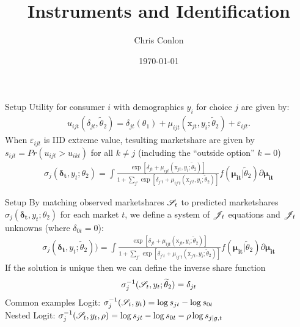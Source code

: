 \documentclass[aspectratio=169,11pt]{beamer}
\begin{document}
\title{Instruments and Identification }
\author{Chris Conlon}
\date{\today}

\frame{\titlepage}


\begin{frame}{Setup}
Utility for consumer $i$ with demographics $y_i$ for choice $j$ are given by:
\begin{align*}
\label{eq:utility}
u_{ijt}(\delta_{jt},\widetilde{\theta}_2) =  \delta_{jt}(\theta_1)  + \mu_{ijt}(\textrm{x}_{jt}, y_i; \widetilde{\theta}_2) + \varepsilon_{ijt}.
\end{align*}
When $\varepsilon_{ijt}$ is IID extreme value, tesulting marketshare are given by $s_{ijt} = Pr(u_{ijt}> u_{ikt})$ for all $k\neq j$ (including the ``outside option'' $k=0$)
\begin{align*}
\sigma_j(\symbf{\delta_t},y_t;\theta_2)=\int \frac{\exp[\delta_{jt}+\mu_{ijt}(\textrm{x}_{jt}, y_i; \widetilde{\theta}_2)]}{1+\sum_{j'} \exp[\delta_{j't}+\mu_{ij't}(\textrm{x}_{j't}, y_i; \widetilde{\theta}_2)]}f(\symbf{\mu_{it}}| \widetilde{\theta}_2) \partial \symbf{\mu_{it}}
\end{align*}
\end{frame}


\begin{frame}{Setup}
By matching observed marketshares $\mathscr{S}_t$ to predicted marketshares $\sigma_j(\symbf{\delta_t},y_t;\theta_2)$ for each market $t$, we define a system of $\mathscr{J}_t$ equations and $\mathscr{J}_t$ unknowns (where $\delta_{0t}=0$):
\begin{align*}
\sigma_j(\symbf{\delta_t},y_t;\widetilde{\theta}_2))=\int \frac{\exp[\delta_{jt}+\mu_{ijt}(\textrm{x}_{jt}, y_i; \widetilde{\theta}_2)]}{1+\sum_{j'} \exp[\delta_{j't}+\mu_{ij't}(\textrm{x}_{j't}, y_i; \widetilde{\theta}_2)]}f(\symbf{\mu_{it}} | \widetilde{\theta}_2) \partial \symbf{\mu_{it}}
\end{align*}
If the solution is unique then we can define the \alert{inverse share function}
\begin{align*}
\sigma_j^{-1}(\mathscr{S}_t,y_t;\widetilde{\theta}_2)=\delta_{jt}
\end{align*}
Common examples Logit: $\sigma_j^{-1}(\mathscr{S}_t,y_t)=\log s_{jt}- \log s_{0t}$\\
Nested Logit: $\sigma_j^{-1}(\mathscr{S}_t,y_t, \rho)=\log s_{jt}- \log s_{0t}- \rho \log s_{j |g, t}$
\end{frame}
\end{document}
